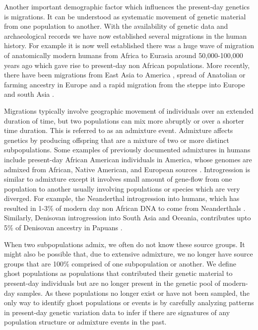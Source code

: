 Another important demographic factor which influences the present-day genetics is migrations. It can be understood as systematic movement of genetic material from one population to another. With the availability of genetic data and archaeological records we have now established several migrations in the human history. For example it is now well established there was a huge wave of migration of anatomically modern humans from Africa to Eurasia around 50,000-100,000 years ago which gave rise to present-day non African populations. More recently, there have been migrations from East Asia to America \cite{reich2012reconstructing}, spread of Anatolian or farming ancestry in Europe \cite{lazaridis2014ancient} and a rapid migration from the steppe into Europe and south Asia \cite{haak2015massive}.

Migrations typically involve geographic movement of individuals over an extended duration of time, but two populations can mix more abruptly or over a shorter time duration. This is referred to as an admixture event. Admixture affects genetics by producing offspring that are a mixture of two or more distinct subpopulations. Some examples of previously documented admixtures in humans include present-day African American individuals in America, whose genomes are admixed from African, Native American, and European sources \cite{smith2004high, price2009sensitive}. Introgression is similar to admixture except it involves small amount of gene-flow from one population to another usually involving populations or species which are very diverged. For example, the Neanderthal introgression into humans, which has resulted in 1-3\% of modern day non African DNA to come from Neanderthals \cite{sankararaman2014genomic}. Similarly, Denisovan introgression into South Asia and Oceania, contributes upto 5\% of Denisovan ancestry in Papuans \cite{reich2010genetic}. 

When two subpopulations admix, we often do not know these source groups. It might also be possible that, due to extensive admixture, we no longer have source groups that are 100\% comprised of one subpopulation or another. We define ghost populations as populations that contributed their genetic material to present-day individuals but are no longer present in the genetic pool of modern-day samples. As these populations no longer exist or have not been sampled, the only way to identify ghost populations or events is by carefully analyzing patterns in present-day genetic variation data to infer if there are signatures of any population structure or admixture events in the past.

